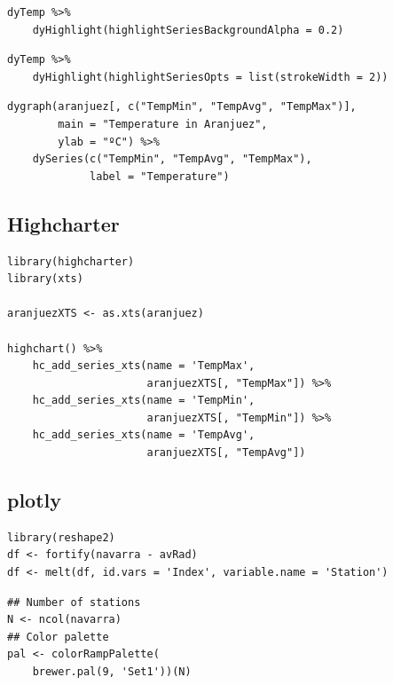 \documentclass[smallroyalvopaper]{memoir}
\begin{document}
\lstset{language=r,label= ,caption= ,captionpos=b,numbers=none}
\begin{lstlisting}
dyTemp %>%
    dyHighlight(highlightSeriesBackgroundAlpha = 0.2)
\end{lstlisting}

\lstset{language=r,label= ,caption= ,captionpos=b,numbers=none}
\begin{lstlisting}
dyTemp %>%
    dyHighlight(highlightSeriesOpts = list(strokeWidth = 2))
\end{lstlisting}

\lstset{language=r,label= ,caption= ,captionpos=b,numbers=none}
\begin{lstlisting}
dygraph(aranjuez[, c("TempMin", "TempAvg", "TempMax")],
        main = "Temperature in Aranjuez",
        ylab = "ºC") %>%
    dySeries(c("TempMin", "TempAvg", "TempMax"),
             label = "Temperature")
\end{lstlisting}

\subsection{Highcharter \label{sec:highcharter}}
\label{sec:orgcb3d21e}

\lstset{language=r,label= ,caption= ,captionpos=b,numbers=none}
\begin{lstlisting}
library(highcharter)
library(xts)

aranjuezXTS <- as.xts(aranjuez)

highchart() %>%
    hc_add_series_xts(name = 'TempMax',
                      aranjuezXTS[, "TempMax"]) %>%
    hc_add_series_xts(name = 'TempMin',
                      aranjuezXTS[, "TempMin"]) %>%
    hc_add_series_xts(name = 'TempAvg',
                      aranjuezXTS[, "TempAvg"])

\end{lstlisting}

\subsection{plotly \label{sec:plotly}}
\label{sec:orgf41c7ac}

\lstset{language=r,label= ,caption= ,captionpos=b,numbers=none}
\begin{lstlisting}
library(reshape2)
df <- fortify(navarra - avRad)
df <- melt(df, id.vars = 'Index', variable.name = 'Station')
\end{lstlisting}

\lstset{language=r,label= ,caption= ,captionpos=b,numbers=none}
\begin{lstlisting}
## Number of stations
N <- ncol(navarra)
## Color palette
pal <- colorRampPalette(
    brewer.pal(9, 'Set1'))(N)
\end{lstlisting}
\end{document}
